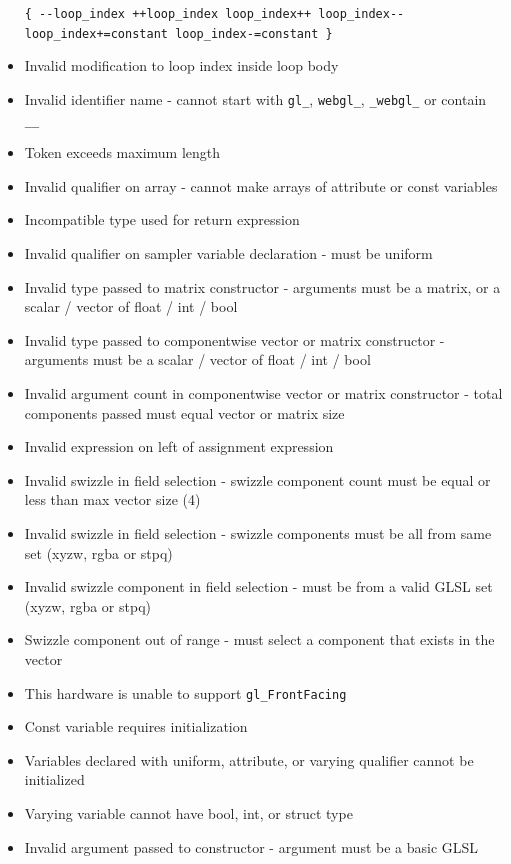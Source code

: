 \documentclass[]{article}
\begin{document}
\begin{itemize}
  \texttt{\{ -\/-loop\_index \textbar{} ++loop\_index \textbar{} loop\_index++ \textbar{} loop\_index-\/- \textbar{} loop\_index+=constant \textbar{} loop\_index-=constant \}}
\item
  Invalid modification to loop index inside loop body
\item
  Invalid identifier name - cannot start with \texttt{gl\_},
  \texttt{webgl\_}, \texttt{\_webgl\_} or contain \texttt{\_\_}
\item
  Token exceeds maximum length
\item
  Invalid qualifier on array - cannot make arrays of attribute or const
  variables
\item
  Incompatible type used for return expression
\item
  Invalid qualifier on sampler variable declaration - must be uniform
\item
  Invalid type passed to matrix constructor - arguments must be a
  matrix, or a scalar / vector of float / int / bool
\item
  Invalid type passed to componentwise vector or matrix constructor -
  arguments must be a scalar / vector of float / int / bool
\item
  Invalid argument count in componentwise vector or matrix constructor -
  total components passed must equal vector or matrix size
\item
  Invalid expression on left of assignment expression
\item
  Invalid swizzle in field selection - swizzle component count must be
  equal or less than max vector size (4)
\item
  Invalid swizzle in field selection - swizzle components must be all
  from same set (xyzw, rgba or stpq)
\item
  Invalid swizzle component in field selection - must be from a valid
  GLSL set (xyzw, rgba or stpq)
\item
  Swizzle component out of range - must select a component that exists
  in the vector
\item
  This hardware is unable to support \texttt{gl\_FrontFacing}
\item
  Const variable requires initialization
\item
  Variables declared with uniform, attribute, or varying qualifier
  cannot be initialized
\item
  Varying variable cannot have bool, int, or struct type
\item
  Invalid argument passed to constructor - argument must be a basic GLSL

\end{itemize}
\end{document}
